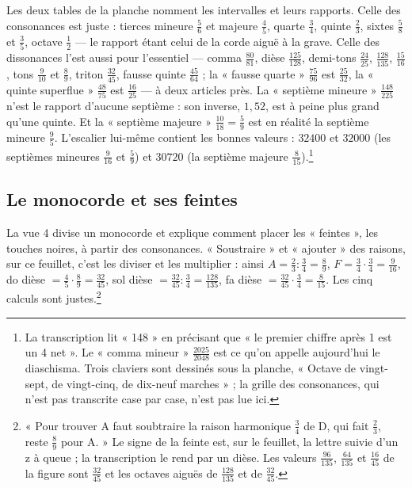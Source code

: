 \documentclass[11pt,a4paper]{article}
\begin{document}
Les deux tables de la planche nomment les intervalles et leurs rapports. Celle
des consonances est juste : tierces mineure $\frac56$ et majeure $\frac45$,
quarte $\frac34$, quinte $\frac23$, sixtes $\frac58$ et $\frac35$, octave
$\frac12$ — le rapport étant celui de la corde aiguë à la grave. Celle des
dissonances l'est aussi pour l'essentiel — comma $\frac{80}{81}$, dièse
$\frac{125}{128}$, demi-tons $\frac{24}{25}$, $\frac{128}{135}$,
$\frac{15}{16}$, tons $\frac{9}{10}$ et $\frac89$, triton $\frac{32}{45}$,
fausse quinte $\frac{45}{64}$ ; la « fausse quarte » $\frac{75}{96}$ est
$\frac{25}{32}$, la « quinte superflue » $\frac{48}{75}$ est $\frac{16}{25}$ —
à deux articles près. La « septième mineure » $\frac{148}{225}$ n'est le rapport
d'aucune septième : son inverse, $1{,}52$, est à peine plus grand qu'une quinte.
Et la « septième majeure » $\frac{10}{18} = \frac59$ est en réalité la septième
mineure $\frac95$. L'escalier lui-même contient les bonnes valeurs : $32400$ et
$32000$ (les septièmes mineures $\frac{9}{16}$ et $\frac59$) et $30720$ (la
septième majeure $\frac{8}{15}$).\footnote{La transcription lit « 148 » en
précisant que « le premier chiffre après 1 est un 4 net ». Le « comma mineur »
$\frac{2025}{2048}$ est ce qu'on appelle aujourd'hui le diaschisma. Trois
claviers sont dessinés sous la planche, « Octave de vingt-sept, de
vingt-cinq, de dix-neuf marches » ; la grille des consonances, qui n'est pas
transcrite case par case, n'est pas lue ici.}

\subsection*{Le monocorde et ses feintes}

La vue 4 divise un monocorde et explique comment placer les « feintes », les
touches noires, à partir des consonances. « Soustraire » et « ajouter » des
raisons, sur ce feuillet, c'est les diviser et les multiplier : ainsi
$A = \frac{2}{3} : \frac{3}{4} = \frac89$, $F = \frac34\cdot\frac34 =
\frac{9}{16}$, do dièse $= \frac45\cdot\frac89 = \frac{32}{45}$, sol dièse
$= \frac{32}{45} : \frac34 = \frac{128}{135}$, fa dièse $= \frac{32}{45}\cdot
\frac34 = \frac{8}{15}$. Les cinq calculs sont justes.\footnote{« Pour
trouver A faut soubtraire la raison harmonique $\frac34$ de D, qui fait
$\frac23$, reste $\frac89$ pour A. » Le signe de la feinte est, sur le
feuillet, la lettre suivie d'un z à queue ; la transcription le rend par un
dièse. Les valeurs $\frac{96}{135}$, $\frac{64}{135}$ et $\frac{16}{45}$ de la
figure sont $\frac{32}{45}$ et les octaves aiguës de $\frac{128}{135}$ et de
$\frac{32}{45}$.}
\end{document}
